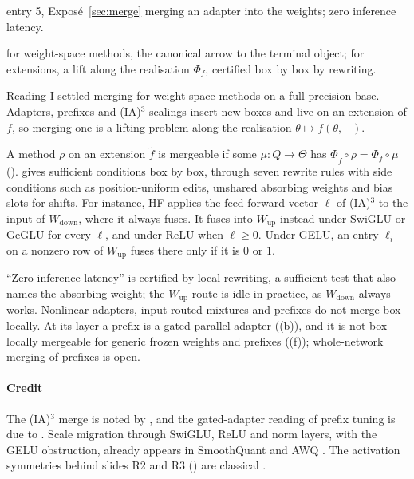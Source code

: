 \begin{example*}{entry 5, Exposé~\ref{sec:merge}}
\enspace merging an adapter into the weights; zero inference latency.\par
\noindent{}\enspace for weight-space methods, the canonical arrow to
the terminal object; for extensions, a lift along the realisation $\Phi_f$, certified box by box by rewriting.
\end{example*}

Reading I settled merging for weight-space methods on a full-precision base. Adapters, prefixes and (IA)$^3$ scalings
insert new boxes and live on an extension of $f$, so merging one is a lifting problem along the realisation
$\theta\mapsto f(\theta,-)$.

A method $\rho$ on an extension $\tilde f$ is mergeable if some $\mu:Q\to\Theta$ has
$\Phi_{\tilde f}\circ\rho=\Phi_f\circ\mu$ ().  gives sufficient
conditions box by box, through seven rewrite rules with side conditions such as position-uniform edits, unshared
absorbing weights and bias slots for shifts. For instance, HF applies the feed-forward vector $\ell$ of (IA)$^3$
\citep{liu2022few} to the input of $W_{\mathrm{down}}$, where it always fuses. It fuses into $W_{\mathrm{up}}$ instead
under SwiGLU or GeGLU for every $\ell$, and under ReLU when $\ell\ge0$. Under GELU, an entry $\ell_i$ on a nonzero row
of $W_{\mathrm{up}}$ fuses there only if it is $0$ or $1$.

\begin{explains}
``Zero inference latency'' is certified by local rewriting, a sufficient test that also names the absorbing weight; the
$W_{\mathrm{up}}$ route is idle in practice, as $W_{\mathrm{down}}$ always works. Nonlinear adapters, input-routed
mixtures and prefixes do not merge box-locally. At its layer a prefix is a gated parallel adapter
((b)), and it is not box-locally mergeable for generic frozen weights and prefixes
((f)); whole-network merging of prefixes is open.
\end{explains}

\paragraph{Credit}
The (IA)$^3$ merge is noted by \citet{liu2022few}, and the gated-adapter reading of prefix tuning is due to
\citet{he2021unified}. Scale migration through SwiGLU, ReLU and norm layers, with the GELU obstruction, already appears
in SmoothQuant \citep{xxiao2023smoothquant} and AWQ \citep{xlin2024awq}. The activation symmetries behind slides R2 and
R3 () are classical \citep{xsussmann1992uniqueness,xchen1993geometry,xgodfrey2022symmetries}.


